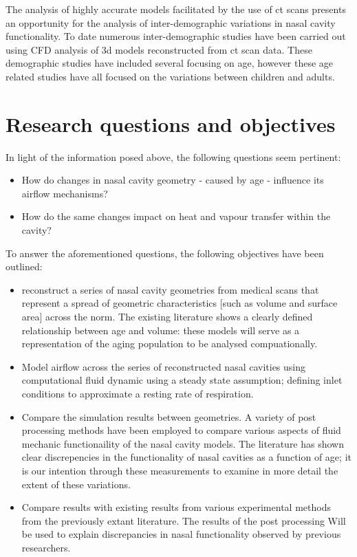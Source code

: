 The analysis of highly accurate models facilitated by the use of ct scans presents an opportunity for the analysis of inter-demographic variations in nasal cavity functionality. To date numerous inter-demographic studies have been carried out using CFD analysis of 3d models reconstructed from ct scan data. These demographic studies have included several focusing on age, however these age related studies have all focused on the variations between children and adults.


\section{Research questions and objectives}

In light of the information posed above, the following questions seem pertinent:

\begin{itemize}

  \item How do changes in nasal cavity geometry - caused by age - influence its airflow mechanisms?

  \item How do the same changes impact on heat and vapour transfer within the cavity?

\end{itemize}

To answer the aforementioned questions, the following objectives have been outlined:

\begin{itemize}

  \item reconstruct a series of nasal cavity geometries from medical scans that represent a spread of geometric characteristics [such as volume and surface area] across the norm. The existing literature shows a clearly defined relationship between age and volume: these models will serve as a representation of the aging population to be analysed compuationally.

  \item Model airflow across the series of reconstructed nasal cavities using computational fluid dynamic using a steady state assumption; defining inlet conditions to approximate a resting rate of respiration. 

  \item Compare the simulation results between geometries. A variety of post processing methods have been employed to compare various aspects of fluid mechanic functionaility of the nasal cavity models. The literature has shown clear discrepencies in the functionality of nasal cavities as a function of age; it is our intention through these measurements to examine in more detail the extent of these variations.

  \item  Compare results with existing results from various experimental methods from the previously extant literature. The results of the post processing Will be used to explain discrepancies in nasal functionality observed by previous researchers.

\end{itemize}
 

